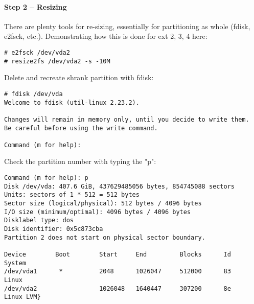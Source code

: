 \paragraph{Step 2 -- Resizing}
There are plenty tools for re-sizing, essentially for partitioning as whole (fdisk, e2fsck, etc.).
Demonstrating how this is done for ext 2, 3, 4 here:
\begin{lstlisting}[columns=fixed,basicstyle=\ttfamily\footnotesize,tabsize=4,backgroundcolor=\color{yellow!10}]
# e2fsck /dev/vda2
# resize2fs /dev/vda2 -s -10M
\end{lstlisting}
Delete and recreate shrank partition with fdisk:
\begin{lstlisting}[columns=fixed,basicstyle=\ttfamily\footnotesize,tabsize=4,backgroundcolor=\color{yellow!10}]
# fdisk /dev/vda
Welcome to fdisk (util-linux 2.23.2).

Changes will remain in memory only, until you decide to write them.
Be careful before using the write command.

Command (m for help):
\end{lstlisting}
Check the partition number with typing the "p":
\begin{lstlisting}[columns=fixed,basicstyle=\ttfamily\footnotesize,tabsize=4,backgroundcolor=\color{yellow!10}]
Command (m for help): p
Disk /dev/vda: 407.6 GiB, 437629485056 bytes, 854745088 sectors
Units: sectors of 1 * 512 = 512 bytes
Sector size (logical/physical): 512 bytes / 4096 bytes
I/O size (minimum/optimal): 4096 bytes / 4096 bytes
Disklabel type: dos
Disk identifier: 0x5c873cba
Partition 2 does not start on physical sector boundary.

Device        Boot        Start     End         Blocks      Id    System
/dev/vda1      *          2048      1026047     512000      83    Linux
/dev/vda2                 1026048   1640447     307200      8e    Linux LVM}
\end{lstlisting}




